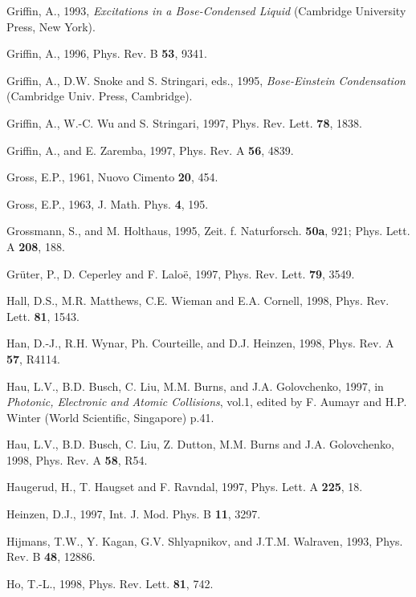 \begin{references}
  Griffin, A., 1993, {\it Excitations in a 
Bose-Condensed Liquid} (Cambridge University Press, New York). 

  Griffin, A., 1996, Phys. Rev. B {\bf 53}, 9341.

  Griffin, A., D.W.  Snoke and S. Stringari, eds.,
1995, {\it Bose-Einstein Condensation} (Cambridge Univ.  Press, Cambridge).

  Griffin, A., W.-C. Wu and S. Stringari, 1997, Phys.
Rev. Lett. {\bf 78}, 1838.

 Griffin, A., and E. Zaremba, 1997, Phys. Rev. A
{\bf 56}, 4839.

    Gross, E.P., 1961, Nuovo Cimento {\bf 20}, 454.

    Gross, E.P., 1963, J. Math. Phys. {\bf 4}, 195.

 Grossmann, S., and M. Holthaus, 1995, Zeit. f.
Naturforsch. {\bf 50a}, 921; Phys. Lett. A {\bf 208}, 188. 

  Gr\"uter, P., D. Ceperley and F. Lalo\"e, 1997,
Phys. Rev. Lett. {\bf 79}, 3549.

   Hall, D.S., M.R. Matthews, C.E. Wieman and E.A. 
Cornell, 1998, Phys. Rev. Lett. {\bf 81}, 1543. 

      Han, D.-J., R.H. Wynar, Ph. Courteille, and D.J.
Heinzen, 1998, Phys. Rev. A {\bf 57}, R4114.

      Hau, L.V., B.D. Busch, C. Liu, M.M. Burns, and 
J.A. Golovchenko, 1997, in {\it Photonic, Electronic and Atomic Collisions},
vol.1, edited by F. Aumayr and H.P. Winter (World Scientific, Singapore)
p.41. 

      Hau, L.V., B.D. Busch, C. Liu, Z. Dutton, M.M. Burns
and J.A. Golovchenko, 1998, Phys. Rev. A {\bf 58}, R54. 

 Haugerud, H., T. Haugset and F. Ravndal, 1997,
Phys. Lett. A {\bf 225}, 18.

  Heinzen, D.J., 1997, Int. J. Mod. Phys. B {\bf 11},
3297.

  Hijmans, T.W., Y. Kagan, G.V. Shlyapnikov, and
J.T.M. Walraven, 1993, Phys. Rev. B {\bf 48}, 12886.

         Ho, T.-L., 1998, Phys. Rev. Lett. {\bf 81}, 742.


\end{references}
